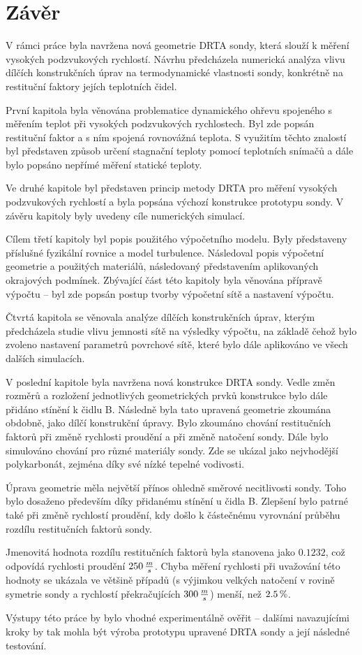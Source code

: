 \section*{Závěr}

V rámci práce byla navržena nová geometrie DRTA sondy, která slouží k měření vysokých podzvukových rychlostí. Návrhu předcházela numerická analýza vlivu dílčích konstrukčních úprav na termodynamické vlastnosti sondy, konkrétně na restituční faktory jejích teplotních čidel.

První kapitola byla věnována problematice dynamického ohřevu spojeného s měřením teplot při vysokých podzvukových rychlostech. Byl zde popsán restituční faktor a s ním spojená rovnovážná teplota. S využitím těchto znalostí byl představen způsob určení stagnační teploty pomocí teplotních snímačů a dále bylo popsáno nepřímé měření statické teploty.

Ve druhé kapitole byl představen princip metody DRTA pro měření vysokých podzvukových rychlostí a byla popsána výchozí konstrukce prototypu sondy. V závěru kapitoly byly uvedeny cíle numerických simulací.

Cílem třetí kapitoly byl popis použitého výpočetního modelu. Byly představeny příslušné fyzikální rovnice a model turbulence. Následoval popis výpočetní geometrie a použitých materiálů, následovaný představením aplikovaných okrajových podmínek. Zbývající část této kapitoly byla věnována přípravě výpočtu – byl zde popsán postup tvorby výpočetní sítě a nastavení výpočtu.

Čtvrtá kapitola se věnovala analýze dílčích konstrukčních úprav, kterým předcházela studie vlivu jemnosti sítě na výsledky výpočtu, na základě čehož bylo zvoleno nastavení parametrů povrchové sítě, které bylo dále aplikováno ve všech dalších simulacích. 

V poslední kapitole byla navržena nová konstrukce DRTA sondy. Vedle změn rozměrů a rozložení jednotlivých geometrických prvků konstrukce bylo dále přidáno stínění k čidlu B. Následně byla tato upravená geometrie zkoumána obdobně, jako dílčí konstrukční úpravy. Bylo zkoumáno chování restitučních faktorů při změně rychlosti proudění a při změně natočení sondy. Dále bylo simulováno chování pro různé materiály sondy. Zde se ukázal jako nejvhodější polykarbonát, zejména díky své nízké tepelné vodivosti. 

Úprava geometrie měla největší přínos ohledně směrové necitlivosti sondy. Toho bylo dosaženo především díky přidanému stínění u čidla B. Zlepšení bylo patrné také při změně rychlostí proudění, kdy došlo k částečnému vyrovnání průběhu rozdílu restitučních faktorů sondy. 

Jmenovitá hodnota rozdílu restitučních faktorů byla stanovena jako $0.1232$, což odpovídá rychlosti proudění $250 \, \frac{m}{s}$. Chyba měření rychlosti při uvažování této hodnoty se ukázala ve většině případů (s výjimkou velkých natočení v rovině symetrie sondy a rychlostí překračujících $300 \, \frac{m}{s}$) menší, než $2.5 \, \%$.

Výstupy této práce by bylo vhodné experimentálně ověřit – dalšími navazujícími kroky by tak mohla být výroba prototypu upravené DRTA sondy a její následné testování. 